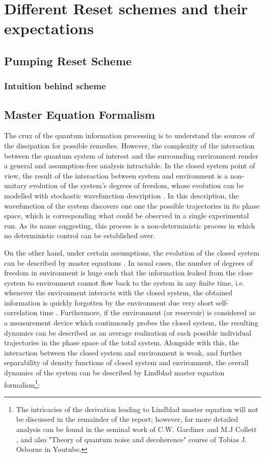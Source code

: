 \chapter{Different Reset schemes and their expectations}

\section{Pumping Reset Scheme}
\subsection{Intuition behind scheme}



\section{Master Equation Formalism}
The crux of the quantum information processing is to understand the sources of the dissipation for possible remedies. However, the complexity of the interaction between the quantum system of interest and the surrounding environment render a general and assumption-free analysis intractable. In the closed system point of view, the result of the interaction between system and environment is a non-unitary evolution of the system's degrees of freedom, whose evolution can be modelled with stochastic wavefunction description \cite{smqo1}. In this description, the wavefunction of the system discovers one one the possible trajectories in its phase space, which is corresponding what could be observed in a single experimental run. As its name suggesting, this process is a non-deterministic process in which no deterministic control can be established over.

\vspace{2 mm}

On the other hand, under certain assumptions, the evolution of the closed system can be described by master equations \cite{davies}. In usual cases, the number of degrees of freedom in environment is huge such that the information leaked from the close system to environment cannot flow back to the system in any finite time, i.e. whenever the environment interacts with the closed system, the obtained information is quickly forgotten by the environment  due very short self-correlation time \cite{ahn}. Furthermore, if the environment (or reservoir) is considered as a measurement device which continuously probes the closed system, the resulting dynamics can be described as an average realization of each possible individual trajectories in the phase space of the total system. Alongside with this, the interaction between the closed system and environment is weak, and further separability of density functions of closed system and environment, the overall dynamics of the system can be described by Lindblad master equation formalism\footnote{The intricacies of the derivation leading to Lindblad master equation will not be discussed in the remainder of the report; however, for more detailed analysis can be found in the seminal work of C.W. Gardiner and M.J Collett \cite{gardinercollet1985}, and also "Theory of quantum noise and decoherence" course of Tobias J. Osborne in Youtube.}: 


